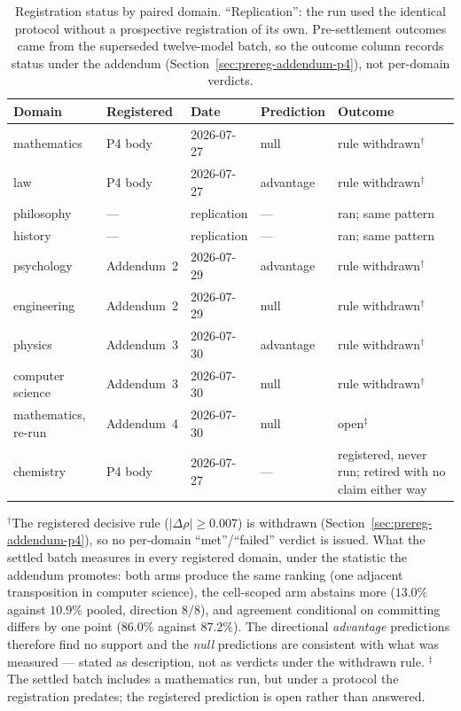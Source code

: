 \begin{table}[htbp]
\centering
\small
\caption{Registration status by paired domain. ``Replication'': the
run used the identical protocol without a prospective registration of
its own. Pre-settlement outcomes came from the superseded
twelve-model batch, so the outcome column records status under the
addendum (Section~\ref{sec:prereg-addendum-p4}), not per-domain
verdicts.}
\label{tab:domain-registration}
\begin{tabular}{lllp{2.0cm}p{2.4cm}}
\toprule
Domain & Registered & Date & Prediction & Outcome \\
\midrule
mathematics & P4 body & 2026-07-27 & null & rule withdrawn$^{\dagger}$ \\
law & P4 body & 2026-07-27 & advantage & rule withdrawn$^{\dagger}$ \\
philosophy & --- & replication & --- & ran; same pattern \\
history & --- & replication & --- & ran; same pattern \\
psychology & Addendum~2 & 2026-07-29 & advantage & rule withdrawn$^{\dagger}$ \\
engineering & Addendum~2 & 2026-07-29 & null & rule withdrawn$^{\dagger}$ \\
physics & Addendum~3 & 2026-07-30 & advantage & rule withdrawn$^{\dagger}$ \\
computer science & Addendum~3 & 2026-07-30 & null & rule withdrawn$^{\dagger}$ \\
mathematics, re-run & Addendum~4 & 2026-07-30 & null & open$^{\ddagger}$ \\
\addlinespace
chemistry & P4 body & 2026-07-27 & --- & registered, never run;
retired with no claim either way \\
\bottomrule
\end{tabular}
\par\smallskip
\footnotesize $^{\dagger}$The registered decisive rule
($|\Delta\rho| \geq 0.007$) is withdrawn
(Section~\ref{sec:prereg-addendum-p4}), so no per-domain
``met''/``failed'' verdict is issued. What the settled batch measures
in every registered domain, under the statistic the addendum promotes:
both arms produce the same ranking (one adjacent transposition in
computer science), the cell-scoped arm abstains more ($13.0\%$ against
$10.9\%$ pooled, direction $8/8$), and agreement conditional on
committing differs by one point ($86.0\%$ against $87.2\%$). The
directional \emph{advantage} predictions therefore find no support and
the \emph{null} predictions are consistent with what was measured ---
stated as description, not as verdicts under the withdrawn rule.
$^{\ddagger}$The settled batch includes a mathematics run, but under a
protocol the registration predates; the registered prediction is open
rather than answered.
\end{table}

